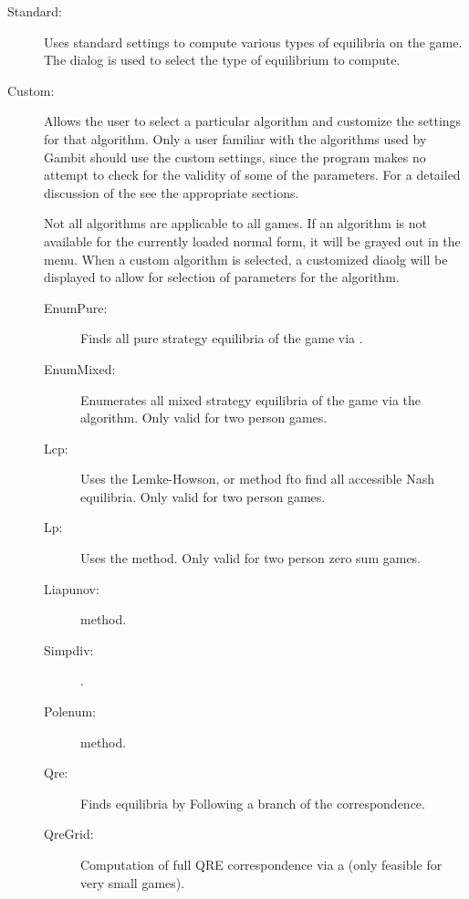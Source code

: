 \begin{description}
\item[Standard:] Uses standard settings to compute various types of
equilibria on the game.  The  dialog is used to select the type of
equilibrium to compute.  
\item[Custom:] Allows the user to select a particular algorithm and
customize the settings for that algorithm.  Only a user familiar with
the algorithms used by Gambit should use the custom settings, since
the program makes no attempt to check for the validity of some of the
parameters.  For a detailed discussion of the 
 see the appropriate sections.

Not all algorithms are applicable to all games.  If an algorithm is
not available for the currently loaded normal form, it will be grayed
out in the menu.  When a custom algorithm is selected, a customized 
 diaolg will be
displayed to allow for selection of parameters for the algorithm.

\begin{description}
\item[EnumPure:] Finds all pure strategy equilibria of the game via 
.
\item[EnumMixed:] Enumerates all mixed strategy equilibria of the
game via the  algorithm. Only valid for two
person games.
\item[Lcp:] Uses the Lemke-Howson, or  method fto find all accessible Nash
equilibria. Only valid for two person games.
\item[Lp:] Uses the  method.  Only
valid for two person zero sum games.
\item[Liapunov:]  method.  
\item[Simpdiv:] . 
\item[Polenum:]  method.  
\item[Qre:] Finds equilibria by Following a branch of the  correspondence.
\item[QreGrid:] Computation of full QRE correspondence via a 
 (only feasible for very small games).
\end{description}
\end{description}

